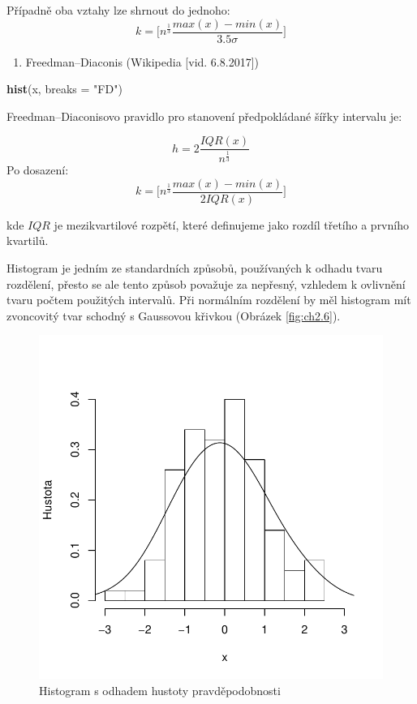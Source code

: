 \documentclass[12pt,]{article}
\newenvironment{Shaded}{\begin{snugshade}}{\end{snugshade}}
\newcommand{\KeywordTok}[1]{\textcolor[rgb]{0.13,0.29,0.53}{\textbf{#1}}}
\newcommand{\DataTypeTok}[1]{\textcolor[rgb]{0.13,0.29,0.53}{#1}}
\newcommand{\StringTok}[1]{\textcolor[rgb]{0.31,0.60,0.02}{#1}}
\newcommand{\NormalTok}[1]{#1}
\providecommand{\tightlist}{%
  \setlength{\itemsep}{0pt}\setlength{\parskip}{0pt}}
\begin{document}
Případně oba vztahy lze shrnout do jednoho:
\[k = \Big[n^{\frac{1}{3}}{\frac{max(x)-min(x)}{3.5 \sigma}}\Big]\]

\begin{enumerate}
\def\labelenumi{\arabic{enumi}.}
\setcounter{enumi}{2}
\tightlist
\item
  Freedman--Diaconis (Wikipedia {[}vid. 6.8.2017{]})
\end{enumerate}

\begin{Shaded}
\begin{Highlighting}[]
\KeywordTok{hist}\NormalTok{(x, }\DataTypeTok{breaks =} \StringTok{"FD"}\NormalTok{)}
\end{Highlighting}
\end{Shaded}

Freedman--Diaconisovo pravidlo pro stanovení předpokládané šířky
intervalu je:

\[h=2\frac{IQR(x)}{n^{\frac{1}{3}}}\] Po dosazení:
\[k = \Big[n^{\frac{1}{3}}{\frac{max(x)-min(x)}{2IQR(x)}}\Big]\]

kde \(IQR\) je mezikvartilové rozpětí, které definujeme jako rozdíl
třetího a prvního kvartilů.

Histogram je jedním ze standardních způsobů, používaných k odhadu tvaru
rozdělení, přesto se ale tento způsob považuje za nepřesný, vzhledem k
ovlivnění tvaru počtem použitých intervalů. Při normálním rozdělení by
měl histogram mít zvoncovitý tvar schodný s Gaussovou křivkou (Obrázek
\ref{fig:ch2.6}).

\begin{figure}[H]

{\centering \includegraphics[width=0.6\linewidth]{BP_files/figure-latex/hist_example-1} 

}

\caption{\label{fig:ch2.6} Histogram s odhadem hustoty pravděpodobnosti}\label{fig:hist_example}
\end{figure}
\end{document}
